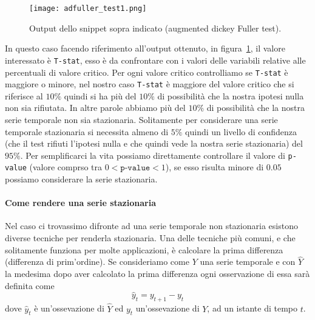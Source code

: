 \begin{figure}[H]
    \centering
    \texttt{[image: adfuller\_test1.png]}
    \caption{Output dello snippet sopra indicato (augmented dickey Fuller test).}
    \label{fig:adft_out_ns}
\end{figure}

In questo caso facendo riferimento all'output ottenuto, in figura~\ref*{fig:adft_out_ns},
il valore interessato è \texttt{T-stat}, esso è da confrontare con i valori delle variabili
relative alle percentuali di valore critico. Per ogni valore critico controlliamo se
\texttt{T-stat} è maggiore o minore, nel nostro caso \texttt{T-stat} è maggiore del valore critico
che si riferisce al $10\%$ quindi si ha più del $10\%$ di possibilità che la nostra ipotesi nulla
non sia rifiutata. In altre parole abbiamo più del $10\%$ di possibilità che la nostra
serie temporale non sia stazionaria. Solitamente per considerare una serie temporale 
stazionaria si necessita almeno di $5\%$ quindi un livello di confidenza (che il test rifiuti
l'ipotesi nulla e che quindi vede la nostra serie stazionaria) del $95\%$.
Per semplificarci la vita possiamo direttamente controllare il valore di \texttt{p-value}
(valore comprso tra $0 < \texttt{p-value} < 1$), se esso risulta minore di $0.05$ possiamo considerare
la serie stazionaria.

\paragraph{Come rendere una serie stazionaria}
Nel caso ci trovassimo difronte ad una serie temporale non stazionaria esistono diverse
tecniche per renderla stazionaria. Una delle tecniche più comuni, e che solitamente funziona per molte
applicazioni, è calcolare la prima differenza (differenza di prim'ordine). Se consideriamo
come $Y$ una serie temporale e con $\hat{Y}$ la medesima dopo aver calcolato la prima 
differenza ogni osservazione di essa sarà definita come
\[ \hat{y}_t = y_{t+1} - y_t \]
dove $\hat{y}_t$ è un'ossevazione di $\hat{Y}$ ed $y_{t}$ un'ossevazione di $Y$, ad un istante
di tempo $t$.
